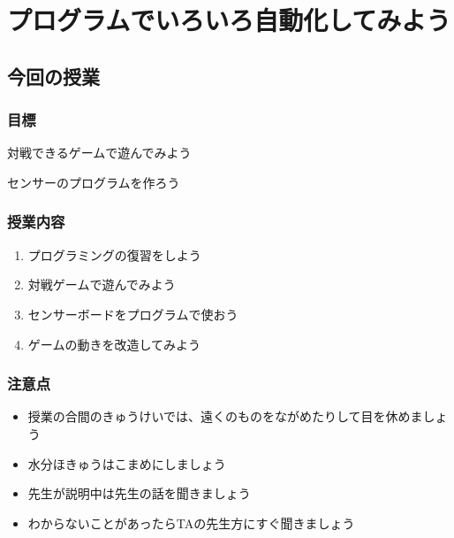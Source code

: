 \chapter{プログラムでいろいろ自動化してみよう}
\section{今回の授業}
\subsection{目標}
対戦できるゲームで遊んでみよう

センサーのプログラムを作ろう

\subsection{授業内容}
\begin{enumerate}
    \item プログラミングの復習をしよう
    \item 対戦ゲームで遊んでみよう
    \item センサーボードをプログラムで使おう
    \item ゲームの動きを改造してみよう
\end{enumerate}

\subsection{注意点}
\begin{itemize}
    \item 授業の合間のきゅうけいでは、遠くのものをながめたりして目を休めましょう
    \item 水分ほきゅうはこまめにしましょう
    \item 先生が説明中は先生の話を聞きましょう
    \item わからないことがあったらTAの先生方にすぐ聞きましょう
\end{itemize}

